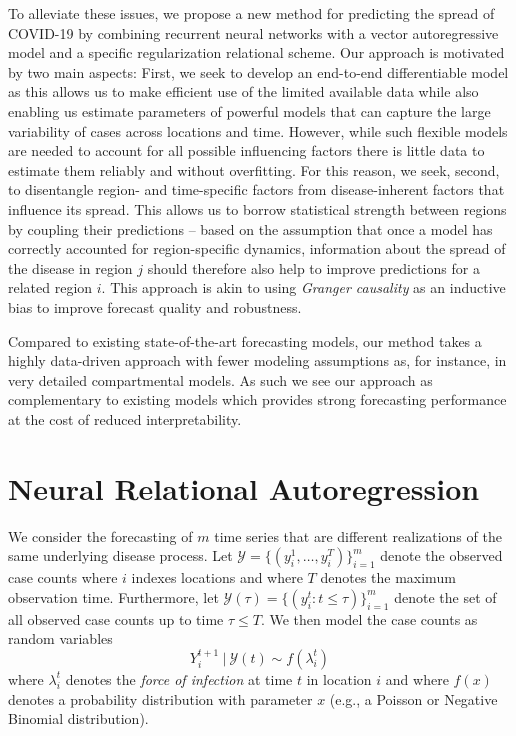 \documentclass[nobib]{tufte-handout}
\newcommand{\Set}[1]{\mathcal{#1}}
\newcommand{\foi}{\lambda}
\begin{document}
To alleviate these issues, we propose a new method for predicting the spread of
COVID-19 by combining recurrent neural networks with a vector autoregressive
model and a specific regularization relational scheme. Our approach is motivated
by two main aspects: First, we seek to develop an end-to-end differentiable
model as this allows us to make efficient use of the limited available data
while also enabling us estimate parameters of powerful models that can capture
the large variability of cases across locations and time. However, while such
flexible models are needed to account for all possible influencing factors there
is little data to estimate them reliably and without overfitting. For this
reason, we seek, second, to disentangle region- and time-specific factors from
disease-inherent factors that influence its spread. This allows us to borrow
statistical strength between regions by coupling their predictions -- based on
the assumption that once a model has correctly accounted for region-specific
dynamics, information about the spread of the disease in region \(j\) should
therefore also help to improve predictions for a related region \(i\). This
approach is akin to using \emph{Granger causality} as an inductive bias to improve
forecast quality and robustness.

Compared to existing state-of-the-art forecasting models, our method takes a
highly data-driven approach with fewer modeling assumptions as, for instance, in
very detailed compartmental models. As such we see our approach as complementary
to existing models which provides strong forecasting performance at the cost of
reduced interpretability.


\section{Neural Relational Autoregression}
\label{sec:org914e4a2}
We consider the forecasting of \(m\) time series that are different realizations
of the same underlying disease process. Let \({\Set{Y} = \{(y_i^1, \ldots,
y_i^T)\}_{i=1}^m}\) denote the observed case counts where \(i\) indexes locations
and where \(T\) denotes the maximum observation time. Furthermore, let
\(\Set{Y}(\tau) = \{(y_i^t : t \leq \tau)\}_{i=1}^m\) denote the set of all
observed case counts up to time \(\tau \leq T\). We then model the case counts as
random variables
\begin{equation*}
    Y^{t+1}_i\ |\ \Set{Y}(t) \sim f(\foi_i^t)
\end{equation*}
where \(\foi_i^{t}\) denotes the \emph{force of infection} at time
\(t\) in location \(i\) and where \(f(x)\) denotes a probability distribution with
parameter \(x\) (e.g., a Poisson or Negative Binomial distribution).
\end{document}
